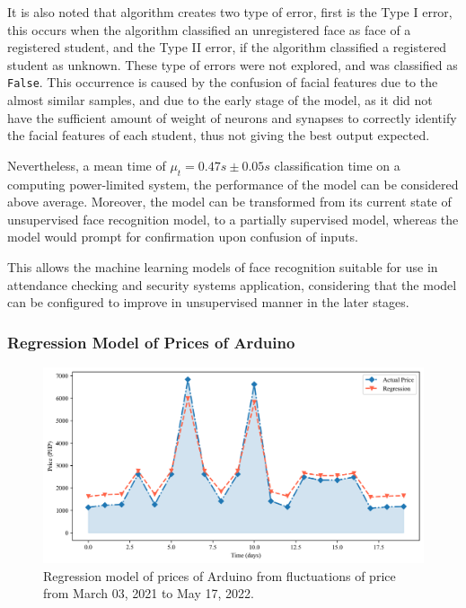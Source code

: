 \documentclass[12pt]{article}
\begin{document}
It is also noted that algorithm creates two type of error, first is the Type I error, this occurs when the algorithm classified an unregistered face as face of a registered student, and the Type II error, if the algorithm classified a registered student as unknown. These type of errors were not explored, and was classified as \texttt{False}. This occurrence is caused by the confusion of facial features due to the almost similar samples, and due to the early stage of the model, as it did not have the sufficient amount of weight of neurons and synapses to correctly identify the facial features of each student, thus not giving the best output expected.

Nevertheless, a mean time of $\mu_{t} = 0.47s \pm 0.05s$ classification time on a computing power-limited system, the performance of the model can be considered above average. Moreover, the model can be transformed from its current state of unsupervised face recognition model, to a partially supervised model, whereas the model would prompt for confirmation upon confusion of inputs.

This allows the machine learning models of face recognition suitable for use in attendance checking and security systems application, considering that the model can be configured to improve in unsupervised manner in the later stages.

\subsubsection*{Regression Model of Prices of Arduino}

\begin{figure}[h!]
	\centering
	\includegraphics*[width=\textwidth]{fig_1r.png}
	\caption{\doublespacing Regression model of prices of Arduino from fluctuations of price from March 03, 2021 to May 17, 2022.\centering}	
\end{figure}
\end{document}
